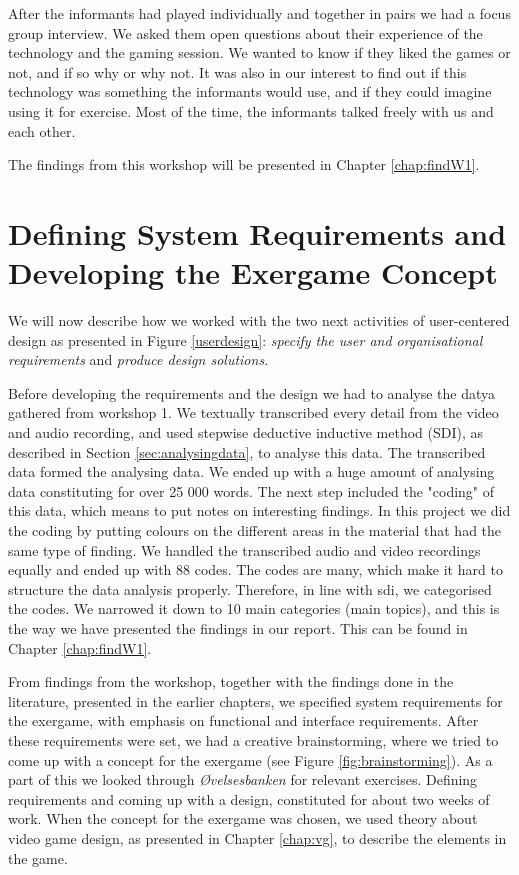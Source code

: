 After the informants had played individually and together in pairs we had a focus group interview. We asked them open questions about their experience of the technology and the gaming session. We wanted to know if they liked the games or not, and if so why or why not. It was also in our interest to find out if this technology was something the informants would use, and if they could imagine using it for exercise. Most of the time, the informants talked freely with us and each other.

The findings from this workshop will be presented in Chapter \ref{chap:findW1}.

\section{Defining System Requirements and Developing the Exergame Concept}                
\label{sec:definingconcept}
We will now describe how we worked with the two next activities of user-centered design as presented in Figure \ref{userdesign}: \emph{specify the user and organisational requirements} and \emph{produce design solutions}.

Before developing the requirements and the design we had to analyse the datya gathered from workshop 1. We textually transcribed every detail from the video and audio recording, and used stepwise deductive inductive method (SDI), as described in Section \ref{sec:analysingdata}, to analyse this data. The transcribed data formed the analysing data. We ended up with a huge amount of analysing data constituting for over 25 000 words. The next step included the "coding" of this data, which means to put notes on interesting findings. In this project we did the coding by putting colours on the different areas in the material that had the same type of finding. We handled the transcribed audio and video recordings equally and ended up with 88 codes.  The codes are many, which make it hard to structure the data analysis properly. Therefore, in line with \ac{sdi}, we categorised the codes. We narrowed it down to 10 main categories (main topics), and this is the way we have presented the findings in our report. This can be found in Chapter \ref{chap:findW1}. 

From findings from the workshop, together with the findings done in the literature, presented in the earlier chapters, we specified system requirements for the exergame, with emphasis on functional and interface requirements. After these requirements were set, we had a creative brainstorming, where we tried to come up with a concept for the exergame (see Figure \ref{fig:brainstorming}). As a part of this we looked through \emph{Øvelsesbanken} \cite{eldretrening} for relevant exercises. Defining requirements and coming up with a design, constituted for about two weeks of work. When the concept for the exergame was chosen, we used theory about video game design, as presented in Chapter \ref{chap:vg}, to describe the elements in the game.

